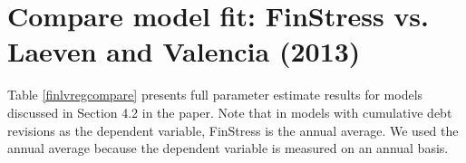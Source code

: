 \documentclass[]{article}
\begin{document}
\section*{Compare model fit: FinStress vs. Laeven and Valencia (2013)}

Table \ref{finlvregcompare} presents full parameter estimate results for models discussed in Section 4.2 in the paper. Note that in models with cumulative debt revisions as the dependent variable, FinStress is the annual average. We used the annual average because the dependent variable is measured on an annual basis.


\end{document}
